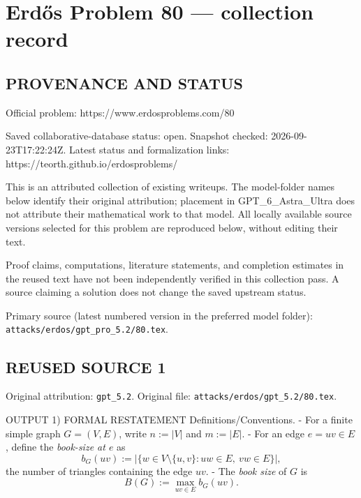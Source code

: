 \section*{Erd\H{o}s Problem 80 --- collection record}

\subsection*{PROVENANCE AND STATUS}
Official problem: https://www.erdosproblems.com/80

Saved collaborative-database status: open.
Snapshot checked: 2026-09-23T17:22:24Z.
Latest status and formalization links: https://teorth.github.io/erdosproblems/

This is an attributed collection of existing writeups. The model-folder names below identify their original attribution; placement in GPT\_6\_Astra\_Ultra does not attribute their mathematical work to that model. All locally available source versions selected for this problem are reproduced below, without editing their text.

Proof claims, computations, literature statements, and completion estimates in the reused text have not been independently verified in this collection pass. A source claiming a solution does not change the saved upstream status.

Primary source (latest numbered version in the preferred model folder): \texttt{attacks/erdos/gpt\_pro\_5.2/80.tex}.

\subsection*{REUSED SOURCE 1}
Original attribution: \texttt{gpt\_5.2}.
Original file: \texttt{attacks/erdos/gpt\_5.2/80.tex}.


OUTPUT
1) FORMAL RESTATEMENT
Definitions/Conventions.
- For a finite simple graph $G=(V,E)$, write $n:=|V|$ and $m:=|E|$.
- For an edge $e=uv\in E$, define the \emph{book-size at $e$} as
\[b_G(uv):=\big|\{w\in V\setminus\{u,v\}: uw\in E,\ vw\in E\}\big|,\]
the number of triangles containing the edge $uv$.
- The \emph{book size} of $G$ is
\[B(G):=\max_{uv\in E} b_G(uv).\]

